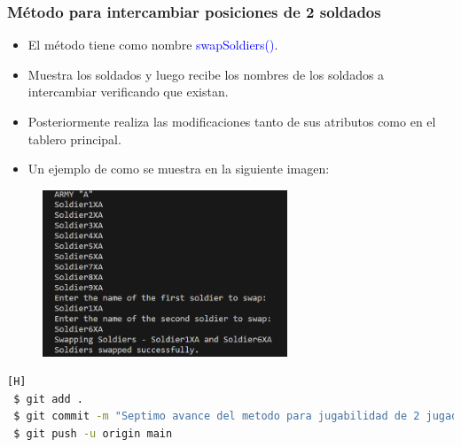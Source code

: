 \documentclass{article}
\begin{document}
\subsubsection{Método para intercambiar posiciones de 2 soldados}
\begin{itemize}
    \item El método tiene como nombre \textcolor{blue}{swapSoldiers()}.
    \item Muestra los soldados y luego recibe los nombres de los soldados a intercambiar verificando que existan.
    \item Posteriormente realiza las modificaciones tanto de sus atributos como en el tablero principal.
\end{itemize}


\begin{itemize}\begin{itemize}\item Un ejemplo de como se muestra en la siguiente imagen:
\end{itemize}\end{itemize}
\begin{figure}[H]
    \centering
    \includegraphics[width=0.65\textwidth,keepaspectratio]{img/12swapSoldiers.png}
    \caption{}
\end{figure}

\begin{lstlisting}[language=bash,caption={Commit \href{https://github.com/hernanchoquehuanca/fp2-23b/commit/c2bd05c15e26514a5164127762e717cb5792d561}{c2bd05c}: Septimo avance del metodo para jugabilidad de 2 jugadores, concluido hasta el lab11}][H]
 $ git add .
 $ git commit -m "Septimo avance del metodo para jugabilidad de 2 jugadores, concluido hasta el lab11"			
 $ git push -u origin main
\end{lstlisting}

\newpage
\end{document}
